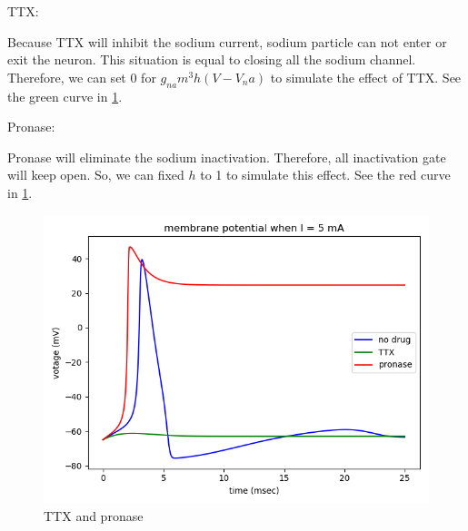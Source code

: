 \documentclass[11pt]{article}
\begin{document}
\begin{enumerate}
		TTX:
		
		Because TTX will inhibit the sodium current, sodium particle can not enter or exit the neuron. This situation is equal to closing all the sodium channel. Therefore, we can set 0 for $g_{na}m^3h(V-V_na)$ to simulate the effect of TTX. See the green curve in \ref{fig:fig5}.
		
		Pronase:
		
		Pronase will eliminate the sodium inactivation. Therefore, all inactivation gate will keep open. So, we can fixed $h$ to 1 to simulate this effect. See the red curve in \ref{fig:fig5}.
		
		\begin{figure}[htb]
			\centering
			\includegraphics[scale=0.3]{plot_programming_7.png}
			\caption{TTX and pronase}
			\label{fig:fig5}
		\end{figure}
	\end{enumerate}
\end{document}
